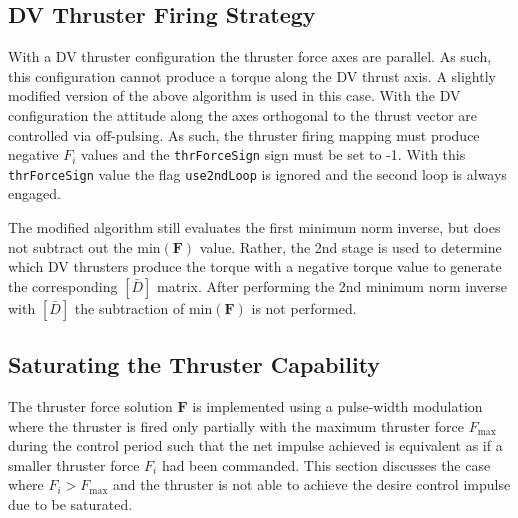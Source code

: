 \subsection{DV Thruster Firing Strategy}
With a DV thruster configuration the thruster force axes are parallel.  As such, this configuration cannot produce a torque along the DV thrust axis.  A slightly modified version of the above algorithm is used in this case.  With the DV configuration the attitude along the axes orthogonal to the thrust vector are controlled via off-pulsing.  As such, the thruster firing mapping must produce negative $F_{i}$ values and the {\tt thrForceSign} sign must be set to -1.  With this  {\tt thrForceSign} value the flag {\tt use2ndLoop} is ignored and the second loop is always engaged.

The modified algorithm still evaluates the first minimum norm inverse, but does not subtract out the $\text{min}(\bm F)$ value.  Rather, the 2nd stage is used to determine which DV thrusters produce the torque with a negative torque value to generate the corresponding $[\bar D]$ matrix.  After performing the 2nd minimum norm inverse with $[\bar D]$ the subtraction of  $\text{min}(\bm F)$ is not performed.  




\subsection{Saturating the Thruster Capability}
The thruster force solution $\bm F$ is implemented using a pulse-width modulation where the thruster is fired only partially with the maximum thruster force $F_{\text{max}}$ during the control period such that the net impulse achieved is equivalent as if a smaller thruster force $F_{i}$ had been commanded.  This section discusses the case where $F_{i}>F_{\text{max}}$ and the thruster is not able to achieve the desire control impulse due to be saturated.  

